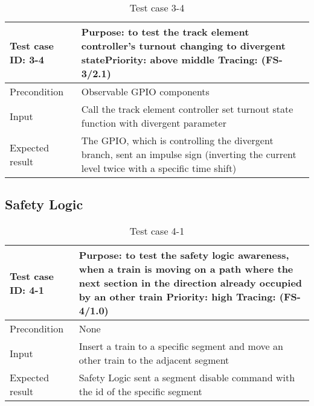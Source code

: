 \begin{table}[H]
	\caption{Test case 3-4}
	\label{table:TCase-FS3-4}
	\begin{center}
		\renewcommand{\arraystretch}{1.8}
		\begin{tabu} 
			to 0.9 \textwidth
			{  X[0.3, l] X[l] }
			\toprule
			Test case ID: 3-4 & Purpose: to test the track element controller's turnout changing to divergent state\newline Priority: above middle \newline Tracing: (FS-3/2.1) \\ \midrule
			Precondition      & Observable GPIO components                                                                                                                      \\
			Input             & Call the track element controller set turnout state function with divergent parameter                                                           \\
			Expected result   & The GPIO, which is controlling the divergent branch, sent an impulse sign (inverting the current level twice with a specific time shift)        \\ \bottomrule
		\end{tabu}
	\end{center}
\end{table}

\subsection{Safety Logic}

\begin{table}[H]
	\caption{Test case 4-1}
	\label{table:TCase-FS4-1}
	\begin{center}
		\renewcommand{\arraystretch}{1.8}
		\begin{tabu} 
			to 0.9 \textwidth
			{  X[0.3, l] X[l] }
			\toprule
			Test case ID: 4-1 & Purpose: to test the safety logic awareness, when a train is moving on a path where the next section in the direction already occupied by an other train \newline Priority: high \newline Tracing: (FS-4/1.0) \\ \midrule
			Precondition      & None                                                                                                                                                                                                          \\
			Input             & Insert a train to a specific segment and move an other train to the adjacent segment                                                                                                                          \\
			Expected result   & Safety Logic sent a segment disable command with the id of the specific segment                                                                                                                               \\ \bottomrule
		\end{tabu}
	\end{center}
\end{table} 


